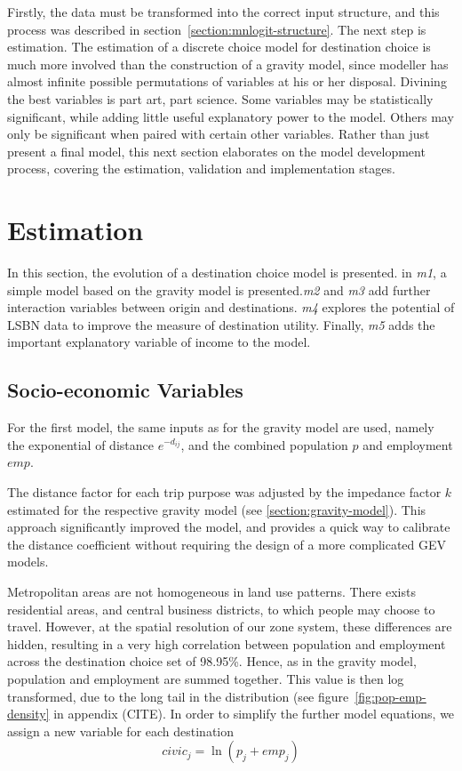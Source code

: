 Firstly, the data must be transformed into the correct input structure, and this process was described in section~\ref{section:mnlogit-structure}. The next step is estimation. The estimation of a discrete choice model for destination choice is much more involved than the construction of a gravity model, since modeller has almost infinite possible permutations of variables at his or her disposal. Divining the best variables is part art, part science. Some variables may be statistically significant, while adding little useful explanatory power to the model. Others may only be significant when paired with certain other variables. Rather than just present a final model, this next section elaborates on the model development process, covering the estimation, validation and implementation stages.

\section{Estimation}
In this section, the evolution of a destination choice model is presented. in \textit{m1}, a simple model based on the gravity model is presented.\textit{m2} and \textit{m3} add further interaction variables between origin and destinations. \textit{m4} explores the potential of LSBN data to improve the measure of destination utility. Finally, \textit{m5} adds the important explanatory variable of income to the model.

\subsection{Socio-economic Variables}
For the first model, the same inputs as for the gravity model are used, namely the exponential of distance $e^{-d_{ij}}$, and the combined population $p$ and employment $emp$.

The distance factor for each trip purpose was adjusted by the impedance factor $k$ estimated for the respective gravity model (see \ref{section:gravity-model}). This approach significantly improved the model, and provides a quick way to calibrate the distance coefficient without requiring the design of a more complicated GEV models.

Metropolitan areas are not homogeneous in land use patterns. There exists residential areas, and central business districts, to which people may choose to travel. However, at the spatial resolution of our zone system, these differences are hidden, resulting in a very high correlation between population and employment across the destination choice set of 98.95\%. Hence, as in the gravity model, population and employment are summed together. This value is  then log transformed, due to the long tail in the distribution (see figure~\ref{fig:pop-emp-density} in appendix (CITE). In order to simplify the further model equations, we assign a new variable for each destination
$$ civic_j = \ln\left( p_j + emp_j \right) $$

